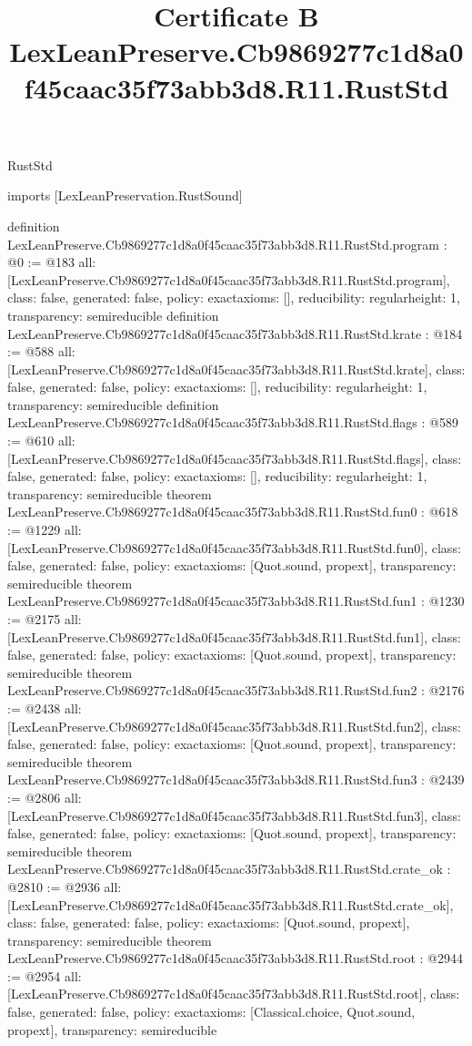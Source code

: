 \begin{lexlean}{RustStd}
\title{Certificate B LexLeanPreserve.Cb9869277c1d8a0f45caac35f73abb3d8.R11.RustStd}
\begin{coremodule}
imports [LexLeanPreservation.RustSound]

definition LexLeanPreserve.Cb9869277c1d8a0f45caac35f73abb3d8.R11.RustStd.program : @0 := @183 {
  all: [LexLeanPreserve.Cb9869277c1d8a0f45caac35f73abb3d8.R11.RustStd.program],
  class: false,
  generated: false,
  policy: exact{axioms: []},
  reducibility: regular{height: 1},
  transparency: semireducible
}
definition LexLeanPreserve.Cb9869277c1d8a0f45caac35f73abb3d8.R11.RustStd.krate : @184 := @588 {
  all: [LexLeanPreserve.Cb9869277c1d8a0f45caac35f73abb3d8.R11.RustStd.krate],
  class: false,
  generated: false,
  policy: exact{axioms: []},
  reducibility: regular{height: 1},
  transparency: semireducible
}
definition LexLeanPreserve.Cb9869277c1d8a0f45caac35f73abb3d8.R11.RustStd.flags : @589 := @610 {
  all: [LexLeanPreserve.Cb9869277c1d8a0f45caac35f73abb3d8.R11.RustStd.flags],
  class: false,
  generated: false,
  policy: exact{axioms: []},
  reducibility: regular{height: 1},
  transparency: semireducible
}
theorem LexLeanPreserve.Cb9869277c1d8a0f45caac35f73abb3d8.R11.RustStd.fun0 : @618 := @1229 {
  all: [LexLeanPreserve.Cb9869277c1d8a0f45caac35f73abb3d8.R11.RustStd.fun0],
  class: false,
  generated: false,
  policy: exact{axioms: [Quot.sound, propext]},
  transparency: semireducible
}
theorem LexLeanPreserve.Cb9869277c1d8a0f45caac35f73abb3d8.R11.RustStd.fun1 : @1230 := @2175 {
  all: [LexLeanPreserve.Cb9869277c1d8a0f45caac35f73abb3d8.R11.RustStd.fun1],
  class: false,
  generated: false,
  policy: exact{axioms: [Quot.sound, propext]},
  transparency: semireducible
}
theorem LexLeanPreserve.Cb9869277c1d8a0f45caac35f73abb3d8.R11.RustStd.fun2 : @2176 := @2438 {
  all: [LexLeanPreserve.Cb9869277c1d8a0f45caac35f73abb3d8.R11.RustStd.fun2],
  class: false,
  generated: false,
  policy: exact{axioms: [Quot.sound, propext]},
  transparency: semireducible
}
theorem LexLeanPreserve.Cb9869277c1d8a0f45caac35f73abb3d8.R11.RustStd.fun3 : @2439 := @2806 {
  all: [LexLeanPreserve.Cb9869277c1d8a0f45caac35f73abb3d8.R11.RustStd.fun3],
  class: false,
  generated: false,
  policy: exact{axioms: [Quot.sound, propext]},
  transparency: semireducible
}
theorem LexLeanPreserve.Cb9869277c1d8a0f45caac35f73abb3d8.R11.RustStd.crate_ok : @2810 := @2936 {
  all: [LexLeanPreserve.Cb9869277c1d8a0f45caac35f73abb3d8.R11.RustStd.crate_ok],
  class: false,
  generated: false,
  policy: exact{axioms: [Quot.sound, propext]},
  transparency: semireducible
}
theorem LexLeanPreserve.Cb9869277c1d8a0f45caac35f73abb3d8.R11.RustStd.root : @2944 := @2954 {
  all: [LexLeanPreserve.Cb9869277c1d8a0f45caac35f73abb3d8.R11.RustStd.root],
  class: false,
  generated: false,
  policy: exact{axioms: [Classical.choice, Quot.sound, propext]},
  transparency: semireducible
}


\end{coremodule}
\end{lexlean}
